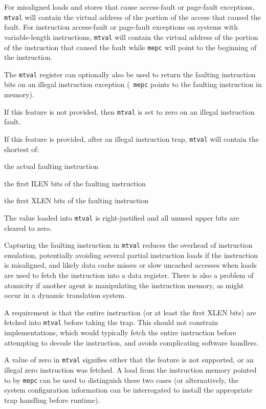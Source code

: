 For misaligned loads and stores that cause access-fault or page-fault exceptions,
{\tt mtval} will contain the virtual address of the portion of the access that
caused the fault.  For instruction access-fault or page-fault exceptions on
systems with variable-length instructions, {\tt mtval} will contain the
virtual address of the portion of the instruction that caused the fault while
{\tt mepc} will point to the beginning of the instruction.

The {\tt mtval} register can optionally also be used to return the
faulting instruction bits on an illegal instruction exception ({\tt
  mepc} points to the faulting instruction in memory).

If this feature is not provided, then {\tt mtval} is set to zero on
an illegal instruction fault.

If this feature is provided, after an illegal instruction trap, {\tt mtval}
will contain the shortest of:
\begin{compactitem}
\item the actual faulting instruction
\item the first ILEN bits of the faulting instruction
\item the first XLEN bits of the faulting instruction
\end{compactitem}
The value loaded into {\tt mtval} is right-justified and all unused upper
bits are cleared to zero.

\begin{commentary}
  Capturing the faulting instruction in {\tt mtval} reduces the
  overhead of instruction emulation, potentially avoiding several
  partial instruction loads if the instruction is misaligned, and
  likely data cache misses or slow uncached accesses when loads are
  used to fetch the instruction into a data register.  There is also a
  problem of atomicity if another agent is manipulating the
  instruction memory, as might occur in a dynamic translation system.

  A requirement is that the entire instruction (or at least the first
  XLEN bits) are fetched into {\tt mtval} before taking the trap.
  This should not constrain implementations, which would typically
  fetch the entire instruction before attempting to decode the
  instruction, and avoids complicating software handlers.

  A value of zero in {\tt mtval} signifies either that the feature is
  not supported, or an illegal zero instruction was fetched.  A load
  from the instruction memory pointed to by {\tt mepc} can be used to
  distinguish these two cases (or alternatively, the system
  configuration information can be interrogated to install the
  appropriate trap handling before runtime).
\end{commentary}

